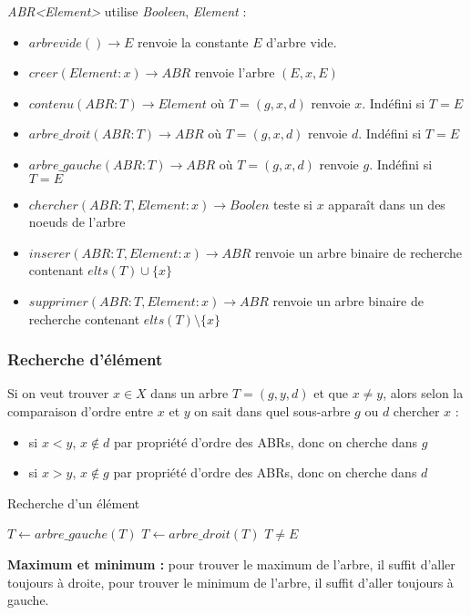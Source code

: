 \documentclass[../../../main.tex]{subfiles}
\begin{document}
\textit{ABR\textless{}Element\textgreater} utilise \textit{Booleen}, \textit{Element} :
\begin{itemize}
	\item $arbrevide()\rightarrow E$ renvoie la constante $E$ d'arbre vide.
	\item $creer(Element:x) \rightarrow ABR$ renvoie l'arbre $(E, x, E)$
	\item $contenu(ABR:T)\rightarrow Element$ où $T = (g, x, d)$ renvoie $x$. Indéfini si $T = E$
	\item $arbre\_droit(ABR:T)\rightarrow ABR$ où $T = (g, x, d)$ renvoie $d$. Indéfini si $T = E$
	\item $arbre\_gauche(ABR:T)\rightarrow ABR$ où $T = (g, x, d)$ renvoie $g$. Indéfini si $T = E$
	\item $chercher(ABR:T, Element:x)\rightarrow Boolen$ teste si $x$ apparaît dans un des noeuds de l'arbre
	\item $inserer(ABR:T, Element:x)\rightarrow ABR$ renvoie un arbre binaire de recherche contenant $elts(T)\cup\{x\}$
	\item $supprimer(ABR:T, Element:x)\rightarrow ABR$ renvoie un arbre binaire de recherche contenant $elts(T)\setminus\{x\}$
\end{itemize}
\subsubsection{Recherche d'élément}
Si on veut trouver $x\in X$ dans un arbre $T = (g, y, d)$ et que $x \neq y$, alors selon la comparaison d'ordre entre $x$ et $y$ on sait dans quel sous-arbre $g$ ou $d$ chercher $x$ :
\begin{itemize}
	\item si $x < y$, $x\notin d$ par propriété d'ordre des ABRs, donc on cherche dans $g$
	\item si $x > y$, $x\notin g$ par propriété d'ordre des ABRs, donc on cherche dans $d$
\end{itemize}
\begin{algorithm}
\caption{Recherche d'un élément \label{alg:recherche_abr}}
 {
	 {
		$T\leftarrow arbre\_gauche(T)$\;
	} {
		$T\leftarrow arbre\_droit(T)$\;
	}
}
\Return $T\neq E$
\end{algorithm}
\textbf{Maximum et minimum :} pour trouver le maximum de l'arbre, il suffit d'aller toujours à droite, pour trouver le minimum de l'arbre, il suffit d'aller toujours à gauche.
\end{document}
